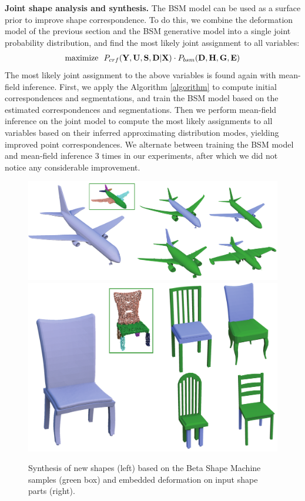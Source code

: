 \textbf{Joint shape analysis and synthesis.}
The BSM model can be used as a surface prior to improve shape correspondence. To do this, we combine the deformation model of the previous section and the BSM generative model into a single joint probability distribution, and find the most likely joint assignment to all variables: 
\begin{align*}
\textrm{maximize~~}
P_{crf}( \mathbf{Y}, \mathbf{U}, \mathbf{S}, \mathbf{D} | \mathbf{X} ) \cdot P_{bsm}( \mathbf{D}, \mathbf{H}, \mathbf{G}, \mathbf{E} )
\end{align*}
The most likely joint assignment to the above variables is found again with mean-field inference. First, we apply the Algorithm \ref{algorithm} to compute initial correspondences and segmentations, and train the BSM model based on the estimated correspondences and segmentations. Then we perform mean-field inference on the joint model to compute the most likely assignments to all variables based on their inferred approximating distribution modes, yielding improved point correspondences. We alternate between training the BSM model and mean-field inference $3$ times in our experiments, after which we did not notice any considerable improvement.

\begin{figure}[t!]
\centering
\includegraphics[width=0.83\columnwidth]{figures/synthesis_airplane}
\vskip -1mm
\includegraphics[width=0.83\columnwidth]{figures/synthesis_chair}
\vskip -3mm
\caption{Synthesis of new shapes (left) based on the Beta Shape Machine samples (green box) and embedded deformation on input shape parts (right).}
\vskip -8mm
\label{fig:synthesis_results}
\end{figure}
